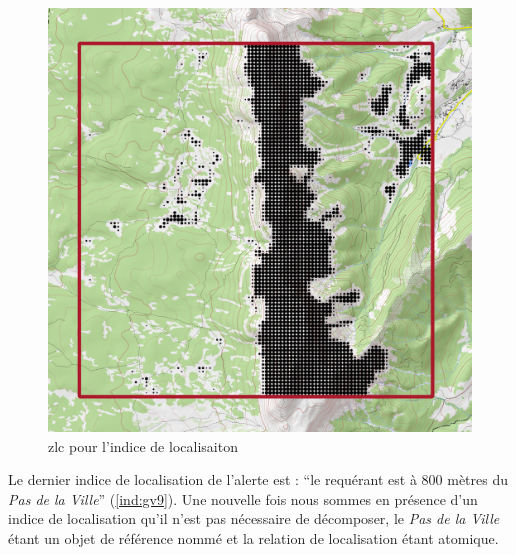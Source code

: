 \begin{figure}
  \centering
  \includegraphics{./figures/NotForet_GrandVeymont.png}
  \caption{\ac{zlc} pour l'indice de localisaiton }
  \label{fig:ZLC_GrandVeymont_X}
\end{figure}





Le dernier indice de localisation de l'alerte est : \enquote{le
  requérant est à 800 mètres du \emph{Pas de la Ville}}
(\ref{ind:gv9}). Une nouvelle fois nous sommes en présence d'un indice
de localisation qu'il n'est pas nécessaire de décomposer, le \emph{Pas
  de la Ville} étant un objet de référence nommé et la relation de
localisation  étant
atomique.

